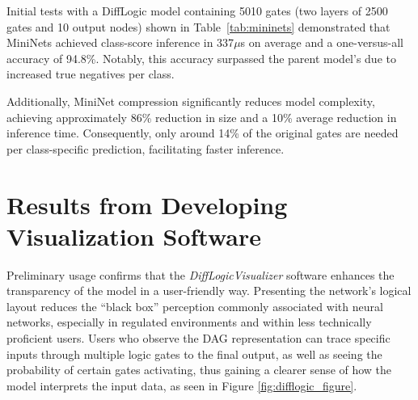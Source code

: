 Initial tests with a DiffLogic model containing 5010 gates (two layers of 2500 gates and 10 output nodes) shown in Table~\ref{tab:mininets} demonstrated that MiniNets achieved class-score inference in 337$\mu$s on average and a one-versus-all accuracy of 94.8\%. Notably, this accuracy surpassed the parent model’s due to increased true negatives per class.

Additionally, MiniNet compression significantly reduces model complexity, achieving approximately 86\% reduction in size and a 10\% average reduction in inference time. Consequently, only around 14\% of the original gates are needed per class-specific prediction, facilitating faster inference.













\section{Results from Developing Visualization Software}
\label{sec:results_visualization}
\label{sec:diffLogicVisualizer_results}

Preliminary usage confirms that the \textit{DiffLogicVisualizer} software enhances the transparency of the model in a user-friendly way. Presenting the network’s logical layout reduces the ``black box'' perception commonly associated with neural networks, especially in regulated environments and within less technically proficient users. Users who observe the DAG representation can trace specific inputs through multiple logic gates to the final output, as well as seeing the probability of certain gates activating, thus gaining a clearer sense of how the model interprets the input data, as seen in Figure  \ref{fig:difflogic_figure}.

